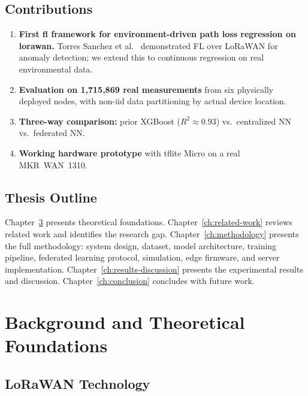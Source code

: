 \documentclass[12pt, a4paper, twoside, openright]{report}
\begin{document}
\section{Contributions}
\label{sec:contributions}
\begin{enumerate}
  \item \textbf{First \gls{fl} framework for environment-driven path loss regression on \gls{lorawan}.} Torres Sanchez et al.~\cite{torressanchez2024federated} demonstrated FL over LoRaWAN for anomaly detection; we extend this to continuous regression on real environmental data.
  \item \textbf{Evaluation on 1,715,869 real measurements} from six physically deployed nodes, with non-\gls{iid} data partitioning by actual device location.
  \item \textbf{Three-way comparison:} prior XGBoost ($R^2 \approx 0.93$) vs.\ centralized NN vs.\ federated NN.
  \item \textbf{Working hardware prototype} with \gls{tflite} Micro on a real MKR~WAN~1310.
\end{enumerate}

\section{Thesis Outline}
\label{sec:outline}
Chapter~\ref{ch:background} presents theoretical foundations. Chapter~\ref{ch:related-work} reviews related work and identifies the research gap. Chapter~\ref{ch:methodology} presents the full methodology: system design, dataset, model architecture, training pipeline, federated learning protocol, simulation, edge firmware, and server implementation. Chapter~\ref{ch:results-discussion} presents the experimental results and discussion. Chapter~\ref{ch:conclusion} concludes with future work.


\chapter{Background and Theoretical Foundations}
\label{ch:background}

\section{LoRaWAN Technology}
\label{sec:lorawan-tech}
\end{document}
